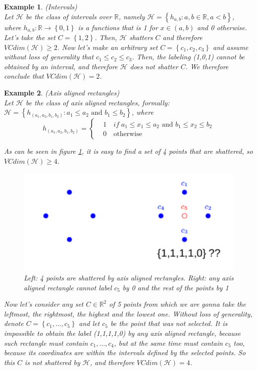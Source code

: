 \documentclass[12pt]{report}
\theoremstyle{plain}
\newtheorem{example}{Example}[chapter]
\newcommand\mcl[1]{\mathcal{#1}}
\begin{document}
\begin{flushleft}
\begin{example} (Intervals)\\
	Let $\mcl{H}$ be the class of intervals over $\mathds{R}$, namely $\mcl{H}=\left\{h_{a,b}:a,b\in\mathds{R},a<b\right\}$, where $h_{a,b}:\mathds{R}\to\left\{0,1\right\}$ is a functions that is 1 for $x\in(a,b)$ and 0 otherwise. Let's take the set $C=\left\{1,2\right\}$. Then, $\mcl{H}$ shatters $C$ and therefore $VCdim(\mcl{H})\geq 2$. Now let's make an arbitrary set $C=\left\{c_1,c_2,c_3\right\}$ and assume without loss of generality that $c_1\leq c_2\leq c_3$. Then, the labeling (1,0,1) cannot be obtained by an interval, and therefore $\mcl{H}$ does not shatter $C$. We therefore conclude that $VCdim(\mcl{H})=2$.
\end{example}

\begin{example} (Axis aligned rectangles)\\
	Let $\mcl{H}$ be the class of axis aligned rectangles, formally: $\mcl{H}=\left\{h_{(a_1,a_2,b_1,b_2)}:a_1\leq a_2 \text{ and } b_1\leq b_2 \right\}$, where 
	\[ h_{(a_1,a_2,b_1,b_2)} = \left\{\begin{aligned}&1\quad if\; a_1\leq x_1\leq a_2 \text{ and } b_1\leq x_2\leq b_2\\ &0\quad\text{otherwise}\end{aligned}\right. \]
	
	As can be seen in figure \ref{fig:axis_al_rect}, it is easy to find a set of 4 points that are shattered, so $VCdim(\mcl{H})\geq 4$. 
	\begin{figure}[!h]
		\centering
		\includegraphics[scale=1]{images/axis_aligned_rectangles.pdf}
		\caption{Left: 4 points are shattered by axis aligned rectangles. Right: any axis aligned rectangle cannot label $c_5$ by 0 and the rest of the points by 1}
		\label{fig:axis_al_rect}
	\end{figure}
	Now let's consider any set $C\in\mathds{R}^2$ of 5 points from which we are gonna take the leftmost, the rightmost, the highest and the lowest one. Without loss of generality, denote $C=\left\{c_1,\dots,c_5\right\}$ and let $c_5$ be the point that was not selected. It is impossible to obtain the label (1,1,1,1,0) by any axis aligned rectangle, because such rectangle must contain $c_1,\dots,c_4$, but at the same time must contain $c_5$ too, because its coordinates are within the intervals defined by the selected points. So this $C$ is not shattered by $\mcl{H}$, and therefore $VCdim(\mcl{H})=4$.
\end{example}


\end{flushleft}
\end{document}
